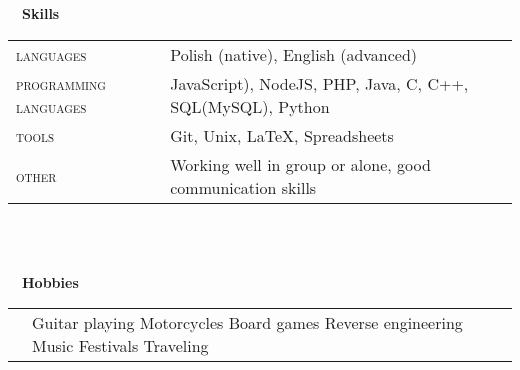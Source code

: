 \documentclass[a4paper, 11pt]{article}
\newcommand{\sectitle}[2]{\large{#1} \ \ \Large{\textbf{#2}}}
\begin{document}
	\begin{section}{\sectitle{\faCogs}{Skills}}
		\begin{tabularx}{\linewidth}{@{}l  X}
			\textsc{languages} & Polish (native), English (advanced)\\
			\textsc{programming languages} & JavaScript), NodeJS, PHP, Java, C, C++, SQL(MySQL), Python \\
			\textsc{tools} & Git, Unix, \LaTeX, Spreadsheets \\
			\textsc{other} & Working well in group or alone, good communication skills
		\end{tabularx}
		\\ \\
	\end{section}
	\vspace{-3.5mm}

	\newcommand{\hobbies}[2]{
		\textsc{#1} & \multicolumn{2}{p{0.9\textwidth}}{\footnotesize{#2}} \\
	}

	\let\cleardoublepage\clearpage
	
	\begin{section}{\sectitle{\faMotorcycle}{Hobbies}}
		\begin{tabularx}{\linewidth}{@{}p{1.4cm} | X r}
			\hobbies{}{
			\normalsize 
			Guitar playing \hspace{6ex}
			Motorcycles \hspace{6ex}
			Board games \hspace{6ex}
			Reverse engineering \hspace{6ex}
			Music \hspace{6ex}
			Festivals \hspace{6ex}
			Traveling \hspace{6ex}
			}
		\end{tabularx}
	\end{section}
	\vspace{-3.5mm}
\end{document}
